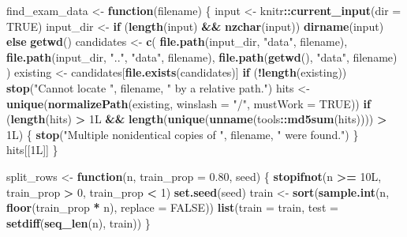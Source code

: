\documentclass[
  11pt,
]{article}
\newenvironment{Shaded}{\begin{snugshade}}{\end{snugshade}}
\newcommand{\AttributeTok}[1]{\textcolor[rgb]{0.13,0.29,0.53}{#1}}
\newcommand{\ConstantTok}[1]{\textcolor[rgb]{0.56,0.35,0.01}{#1}}
\newcommand{\ControlFlowTok}[1]{\textcolor[rgb]{0.13,0.29,0.53}{\textbf{#1}}}
\newcommand{\DataTypeTok}[1]{\textcolor[rgb]{0.13,0.29,0.53}{#1}}
\newcommand{\DecValTok}[1]{\textcolor[rgb]{0.00,0.00,0.81}{#1}}
\newcommand{\FloatTok}[1]{\textcolor[rgb]{0.00,0.00,0.81}{#1}}
\newcommand{\FunctionTok}[1]{\textcolor[rgb]{0.13,0.29,0.53}{\textbf{#1}}}
\newcommand{\NormalTok}[1]{#1}
\newcommand{\OtherTok}[1]{\textcolor[rgb]{0.56,0.35,0.01}{#1}}
\newcommand{\SpecialCharTok}[1]{\textcolor[rgb]{0.81,0.36,0.00}{\textbf{#1}}}
\newcommand{\StringTok}[1]{\textcolor[rgb]{0.31,0.60,0.02}{#1}}
\begin{document}
\begin{Shaded}
\begin{Highlighting}[]
\NormalTok{find\_exam\_data }\OtherTok{\textless{}{-}} \ControlFlowTok{function}\NormalTok{(filename) \{}
\NormalTok{  input }\OtherTok{\textless{}{-}}\NormalTok{ knitr}\SpecialCharTok{::}\FunctionTok{current\_input}\NormalTok{(}\AttributeTok{dir =} \ConstantTok{TRUE}\NormalTok{)}
\NormalTok{  input\_dir }\OtherTok{\textless{}{-}} \ControlFlowTok{if}\NormalTok{ (}\FunctionTok{length}\NormalTok{(input) }\SpecialCharTok{\&\&} \FunctionTok{nzchar}\NormalTok{(input)) }\FunctionTok{dirname}\NormalTok{(input) }\ControlFlowTok{else} \FunctionTok{getwd}\NormalTok{()}
\NormalTok{  candidates }\OtherTok{\textless{}{-}} \FunctionTok{c}\NormalTok{(}
    \FunctionTok{file.path}\NormalTok{(input\_dir, }\StringTok{"data"}\NormalTok{, filename),}
    \FunctionTok{file.path}\NormalTok{(input\_dir, }\StringTok{".."}\NormalTok{, }\StringTok{"data"}\NormalTok{, filename),}
    \FunctionTok{file.path}\NormalTok{(}\FunctionTok{getwd}\NormalTok{(), }\StringTok{"data"}\NormalTok{, filename)}
\NormalTok{  )}
\NormalTok{  existing }\OtherTok{\textless{}{-}}\NormalTok{ candidates[}\FunctionTok{file.exists}\NormalTok{(candidates)]}
  \ControlFlowTok{if}\NormalTok{ (}\SpecialCharTok{!}\FunctionTok{length}\NormalTok{(existing)) }\FunctionTok{stop}\NormalTok{(}\StringTok{"Cannot locate "}\NormalTok{, filename, }\StringTok{" by a relative path."}\NormalTok{)}
\NormalTok{  hits }\OtherTok{\textless{}{-}} \FunctionTok{unique}\NormalTok{(}\FunctionTok{normalizePath}\NormalTok{(existing, }\AttributeTok{winslash =} \StringTok{"/"}\NormalTok{, }\AttributeTok{mustWork =} \ConstantTok{TRUE}\NormalTok{))}
  \ControlFlowTok{if}\NormalTok{ (}\FunctionTok{length}\NormalTok{(hits) }\SpecialCharTok{\textgreater{}} \DecValTok{1}\DataTypeTok{L} \SpecialCharTok{\&\&} \FunctionTok{length}\NormalTok{(}\FunctionTok{unique}\NormalTok{(}\FunctionTok{unname}\NormalTok{(tools}\SpecialCharTok{::}\FunctionTok{md5sum}\NormalTok{(hits)))) }\SpecialCharTok{\textgreater{}} \DecValTok{1}\DataTypeTok{L}\NormalTok{) \{}
    \FunctionTok{stop}\NormalTok{(}\StringTok{"Multiple nonidentical copies of "}\NormalTok{, filename, }\StringTok{" were found."}\NormalTok{)}
\NormalTok{  \}}
\NormalTok{  hits[[}\DecValTok{1}\DataTypeTok{L}\NormalTok{]]}
\NormalTok{\}}

\NormalTok{split\_rows }\OtherTok{\textless{}{-}} \ControlFlowTok{function}\NormalTok{(n, }\AttributeTok{train\_prop =} \FloatTok{0.80}\NormalTok{, seed) \{}
  \FunctionTok{stopifnot}\NormalTok{(n }\SpecialCharTok{\textgreater{}=} \DecValTok{10}\DataTypeTok{L}\NormalTok{, train\_prop }\SpecialCharTok{\textgreater{}} \DecValTok{0}\NormalTok{, train\_prop }\SpecialCharTok{\textless{}} \DecValTok{1}\NormalTok{)}
  \FunctionTok{set.seed}\NormalTok{(seed)}
\NormalTok{  train }\OtherTok{\textless{}{-}} \FunctionTok{sort}\NormalTok{(}\FunctionTok{sample.int}\NormalTok{(n, }\FunctionTok{floor}\NormalTok{(train\_prop }\SpecialCharTok{*}\NormalTok{ n), }\AttributeTok{replace =} \ConstantTok{FALSE}\NormalTok{))}
  \FunctionTok{list}\NormalTok{(}\AttributeTok{train =}\NormalTok{ train, }\AttributeTok{test =} \FunctionTok{setdiff}\NormalTok{(}\FunctionTok{seq\_len}\NormalTok{(n), train))}
\NormalTok{\}}


\end{Highlighting}
\end{Shaded}
\end{document}
